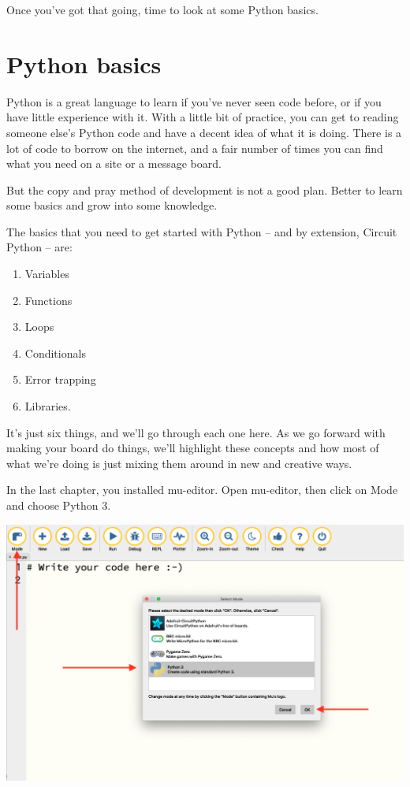 \documentclass[
]{book}
\providecommand{\tightlist}{%
  \setlength{\itemsep}{0pt}\setlength{\parskip}{0pt}}
\begin{document}
Once you've got that going, time to look at some Python basics.

\hypertarget{python-basics}{%
\chapter{Python basics}\label{python-basics}}

Python is a great language to learn if you've never seen code before, or if you have little experience with it. With a little bit of practice, you can get to reading someone else's Python code and have a decent idea of what it is doing. There is a lot of code to borrow on the internet, and a fair number of times you can find what you need on a site or a message board.

But the copy and pray method of development is not a good plan. Better to learn some basics and grow into some knowledge.

The basics that you need to get started with Python -- and by extension, Circuit Python -- are:

\begin{enumerate}
\def\labelenumi{\arabic{enumi}.}
\tightlist
\item
  Variables
\item
  Functions
\item
  Loops
\item
  Conditionals
\item
  Error trapping
\item
  Libraries.
\end{enumerate}

It's just six things, and we'll go through each one here. As we go forward with making your board do things, we'll highlight these concepts and how most of what we're doing is just mixing them around in new and creative ways.

In the last chapter, you installed mu-editor. Open mu-editor, then click on Mode and choose Python 3.

\includegraphics[width=1\linewidth]{images/02image1}
\end{document}
